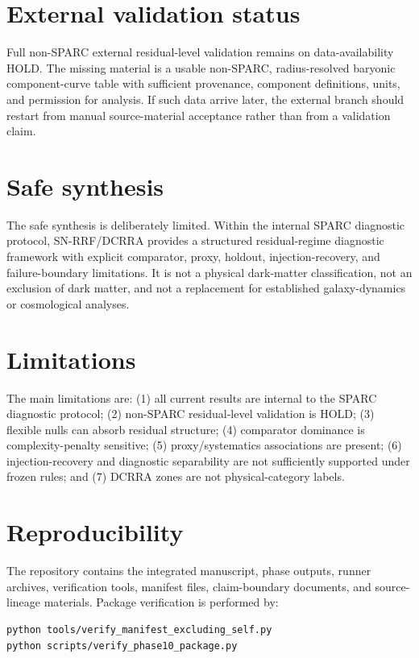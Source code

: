 \documentclass[11pt]{article}
\newcommand{\RR}{SN-RRF/DCRRA}
\begin{document}
\section{External validation status}
Full non-SPARC external residual-level validation remains on data-availability HOLD. The missing material is a usable non-SPARC, radius-resolved baryonic component-curve table with sufficient provenance, component definitions, units, and permission for analysis. If such data arrive later, the external branch should restart from manual source-material acceptance rather than from a validation claim.

\section{Safe synthesis}
The safe synthesis is deliberately limited. Within the internal SPARC diagnostic protocol, \RR{} provides a structured residual-regime diagnostic framework with explicit comparator, proxy, holdout, injection-recovery, and failure-boundary limitations. It is not a physical dark-matter classification, not an exclusion of dark matter, and not a replacement for established galaxy-dynamics or cosmological analyses.

\section{Limitations}
The main limitations are: (1) all current results are internal to the SPARC diagnostic protocol; (2) non-SPARC residual-level validation is HOLD; (3) flexible nulls can absorb residual structure; (4) comparator dominance is complexity-penalty sensitive; (5) proxy/systematics associations are present; (6) injection-recovery and diagnostic separability are not sufficiently supported under frozen rules; and (7) DCRRA zones are not physical-category labels.

\section{Reproducibility}
The repository contains the integrated manuscript, phase outputs, runner archives, verification tools, manifest files, claim-boundary documents, and source-lineage materials. Package verification is performed by:
\begin{verbatim}
python tools/verify_manifest_excluding_self.py
python scripts/verify_phase10_package.py
\end{verbatim}
\end{document}
